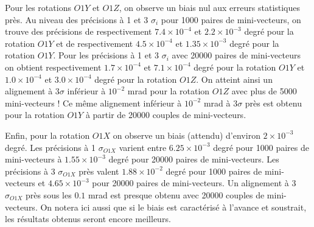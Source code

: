   Pour les rotations $O1Y$ et $O1Z$, on observe un biais nul aux erreurs statistiques pr\`es. Au niveau des pr\'ecisions \`a 1 et 3 $\sigma_i$ pour 1000 paires de mini-vecteurs, on trouve des pr\'ecisions de respectivement $7.4 \times 10^{-4}$ et $2.2 \times 10^{-3}$ degr\'e pour la rotation $O1Y$ et de respectivement $4.5 \times 10^{-4}$ et $1.35 \times 10^{-3}$ degr\'e pour la rotation $O1Y$. Pour les pr\'ecisions \`a 1 et 3 $\sigma_i$ avec 20000 paires de mini-vecteurs on obtient respectivement $1.7 \times 10^{-4}$ et $7.1 \times 10^{-4}$ degr\'e pour la rotation $O1Y$ et $1.0 \times 10^{-4}$ et $3.0 \times 10^{-4}$ degr\'e pour la rotation $O1Z$. On atteint ainsi un alignement \`a $3 \sigma$ inf\'erieur \`a $10^{-2}$ mrad pour la rotation $O1Z$ avec plus de 5000 mini-vecteurs ! Ce m\^eme alignement inf\'erieur \`a $10^{-2}$ mrad \`a $3 \sigma$ pr\`es est obtenu pour la rotation $O1Y$ \`a partir de 20000 couples de mini-vecteurs.
 
  \medskip
 
  Enfin, pour la rotation $O1X$ on observe un biais (attendu) d'environ $2\times 10^{-3}$ degr\'e. Les pr\'ecisions \`a 1 $\sigma_{O1X}$ varient entre $6.25 \times 10^{-3}$ degr\'e pour 1000 paires de mini-vecteurs \`a $1.55 \times 10^{-3}$ degr\'e pour 20000 paires de mini-vecteurs. Les pr\'ecisions \`a 3 $\sigma_{O1X}$ pr\`es valent $1.88 \times 10^{-2}$ degr\'e pour 1000 paires de mini-vecteurs et $4.65 \times 10^{-3}$ pour 20000 paires de mini-vecteurs. Un alignement \`a 3 $\sigma_{O1X}$ pr\`es sous les $0.1$ mrad est presque obtenu avec 20000 couples de mini-vecteurs. On notera ici aussi que si le biais est caract\'eris\'e \`a l'avance et soustrait, les r\'esultats obtenus seront encore meilleurs.
  
